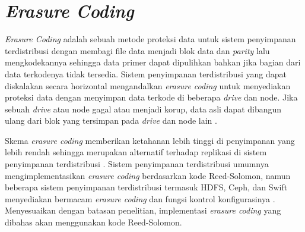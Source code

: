 \section{\textit{Erasure Coding}}
\label{sec:erasure-coding}

\textit{Erasure Coding} adalah sebuah metode proteksi data untuk sistem penyimpanan terdistribusi dengan membagi file data menjadi blok data dan \textit{parity} lalu mengkodekannya sehingga data primer dapat dipulihkan bahkan jika bagian dari data terkodenya tidak tersedia. Sistem penyimpanan terdistribusi yang dapat diskalakan secara horizontal mengandalkan \textit{erasure coding} untuk menyediakan proteksi data dengan menyimpan data terkode di beberapa \textit{drive} dan node. Jika sebuah \textit{drive} atau node gagal atau menjadi korup, data asli dapat dibangun ulang dari blok yang tersimpan pada \textit{drive} dan node lain \parencite{minio2022erasure}.

Skema \textit{erasure coding} memberikan ketahanan lebih tinggi di penyimpanan yang lebih rendah sehingga merupakan alternatif terhadap replikasi di sistem penyimpanan terdistribusi \parencite{silberstein2014lazy}. Sistem penyimpanan terdistribusi umumnya mengimplementasikan \textit{erasure coding} berdasarkan kode Reed-Solomon, namun beberapa sistem penyimpanan terdistribusi termasuk HDFS, Ceph, dan Swift menyediakan bermacam \textit{erasure coding} dan fungsi kontrol konfigurasinya \parencite{kim2021erasure}. Menyesuaikan dengan batasan penelitian, implementasi \textit{erasure coding} yang dibahas akan menggunakan kode Reed-Solomon.





